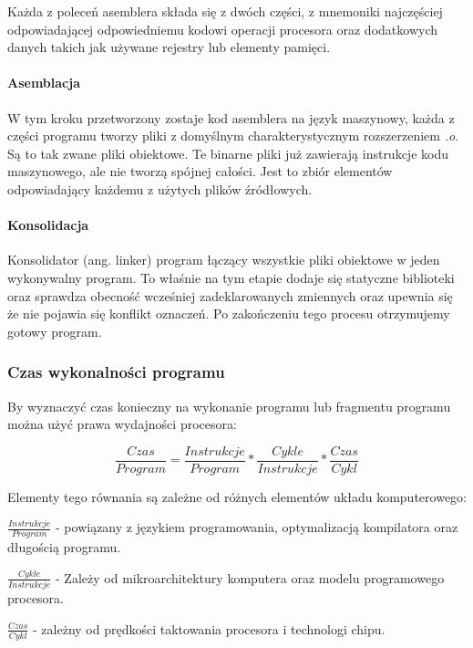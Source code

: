 Każda z poleceń asemblera składa się z dwóch części, z mnemoniki najczęściej odpowiadającej odpowiedniemu kodowi operacji procesora oraz dodatkowych danych takich jak używane rejestry lub elementy pamięci. 

\paragraph{Asemblacja}

W tym kroku przetworzony zostaje kod asemblera na język maszynowy, każda z części programu tworzy pliki z domyślnym charakterystycznym rozszerzeniem \textit{.o}.
Są to tak zwane pliki obiektowe.
Te binarne pliki już zawierają instrukcje kodu maszynowego, ale nie tworzą spójnej całości. Jest to zbiór elementów odpowiadający każdemu z użytych plików źródłowych.

\paragraph{Konsolidacja}
Konsolidator (ang. linker) program łączący wszystkie pliki obiektowe w jeden wykonywalny program. To właśnie na tym etapie dodaje się statyczne biblioteki oraz sprawdza obecność wcześniej zadeklarowanych zmiennych oraz upewnia się że nie pojawia się konflikt oznaczeń. Po zakończeniu tego procesu otrzymujemy gotowy program. 


\subsubsection{Czas wykonalności programu}

By wyznaczyć czas konieczny na wykonanie programu lub fragmentu programu można użyć prawa wydajności procesora\cite{arch}:

\begin{equation}
        \label{Iron Law}
        \frac{Czas}{Program} =  \frac{Instrukcje}{Program} * \frac{Cykle}{Instrukcje} * \frac{Czas}{Cykl}
\end{equation}

Elementy tego równania są zależne od różnych elementów układu komputerowego:
\begin{description}
        \item $\frac{Instrukcje}{Program}$ - powiązany z językiem programowania, optymalizacją kompilatora oraz długością programu. 
        \item $\frac{Cykle}{Instrukcje}$ - Zależy od mikroarchitektury komputera oraz modelu programowego procesora.
        \item $\frac{Czas}{Cykl}$ -  zależny od prędkości taktowania procesora i technologi chipu. 
\end{description} 


